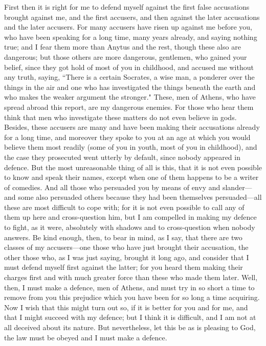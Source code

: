 \documentclass[letterpaper,12pt]{article}
\newcommand{\stephpag}[1]{\marginnote{\small\itshape\fontfamily{ppl}\selectfont #1}}
\begin{document}
First then it is right for me to defend myself against the first false accusations brought against me, and the first accusers, and then against the later accusations and the later accusers. \stephpag{b} For many accusers have risen up against me before you, who have been speaking for a long time, many years already, and saying nothing true; and I fear them more than Anytus and the rest, though these also are dangerous; but those others are more dangerous, gentlemen, who gained your belief, since they got hold of most of you in childhood, and accused me without any truth, saying, ``There is a certain Socrates, a wise man, a ponderer over the things in the air and one who has investigated the things beneath the earth and who makes the weaker argument the stronger." These, men of Athens, \stephpag{c} who have spread abroad this report, are my dangerous enemies. For those who hear them think that men who investigate these matters do not even believe in gods. Besides, these accusers are many and have been making their accusations already for a long time, and moreover they spoke to you at an age at which you would believe them most readily (some of you in youth, most of you in childhood), and the case they prosecuted went utterly by default, since nobody appeared in defence. But the most unreasonable thing of all is this, that it is not even possible \stephpag{d} to know and speak their names, except when one of them happens to be a writer of comedies. And all those who persuaded you by means of envy and slander---and some also persuaded others because they had been themselves persuaded---all these are most difficult to cope with; for it is not even possible to call any of them up here and cross-question him, but I am compelled in making my defence to fight, as it were, absolutely with shadows and to cross-question when nobody answers. Be kind enough, then, to bear in mind, as I say, that there are two classes \stephpag{e} of my accusers---one those who have just brought their accusation, the other those who, as I was just saying, brought it long ago, and consider that I must defend myself first against the latter; for you heard them making their charges first and with much greater force than these who made them later. Well, then, I must make a defence, men of Athens, \stephpag{19 a} and must try in so short a time to remove from you this prejudice which you have been for so long a time acquiring. Now I wish that this might turn out so, if it is better for you and for me, and that I might succeed with my defence; but I think it is difficult, and I am not at all deceived about its nature. But nevertheless, let this be as is pleasing to God, the law must be obeyed and I must make a defence.
\end{document}
